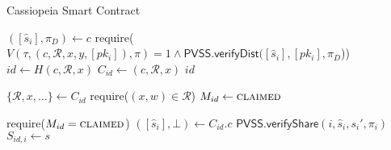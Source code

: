 \begin{algorithm}[h]
\caption{Cassiopeia Smart Contract}
\label{alg:cassiopeia_no_incentives}
    \begin{algorithmic}[1]
            
                \State $([\hat{s}_i], \pi_D) \gets c$
                \State require($V(\tau, (c, \mathcal{R}, x, y, [pk_i]), \pi) = 1 \land \textsf{PVSS.verifyDist}([\hat{s}_i], [pk_i], \pi_D$))
                \State $id \gets H(c, \mathcal{R}, x)$
                \State $C_{id} \gets (c, \mathcal{R}, x)$
                \State \Return $id$
            \EndFunction
            
                \State $\{\mathcal{R}, x, \dots\} \gets C_{id}$
                \State require($(x, w) \in \mathcal{R}$)
                \State $M_{id} \gets \textsc{claimed}$
            \EndFunction
            
                \State require($M_{id} = \textsc{claimed}$)
                \State $([\hat{s}_i], \bot) \gets C_{id}.c$
                \State $\textsf{PVSS.verifyShare}(i, \hat{s}_i, s_i', \pi_i)$
                \State $S_{id,i} \gets s$
            \EndFunction
        \EndContract
    \end{algorithmic}
\end{algorithm}
